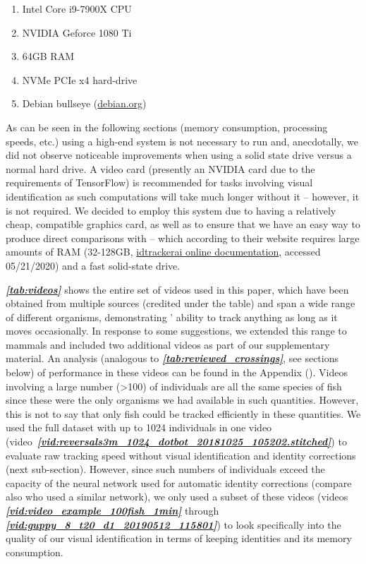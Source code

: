 \documentclass[9pt,lineno]{elife}
\newcommand{\vidref}[1]{\textit{\textbf{\ref{#1}}}}
\newcommand{\tableref}[1]{\textit{\textbf{\ref{tab:#1}}}\xspace}
\newcommand{\videoref}[1]{video~\textit{\textbf{\ref{#1}}}}
\newcommand{\idtracker}{\protect\path{ idtracker.ai}}
\newcommand{\TRex}{\protect\path{TRex}}
\begin{document}
\begin{enumerate} [label=\textnormal{$\bullet$}]
\item \label{ref:hardware_recommend} Intel Core i9-7900X CPU
\item NVIDIA Geforce 1080 Ti
\item 64GB RAM
\item NVMe PCIe x4 hard-drive
\item Debian bullseye (\href{https://www.debian.org/devel/debian-installer/}{debian.org})
\end{enumerate}

As can be seen in the following sections (memory consumption, processing speeds, etc.) using a high-end system is not necessary to run \TRex{} and, anecdotally, we did not observe noticeable improvements when using a solid state drive versus a normal hard drive. A video card (presently an NVIDIA card due to the requirements of TensorFlow) is recommended for tasks involving visual identification as such computations will take much longer without it -- however, it is not required. We decided to employ this system due to having a relatively cheap, compatible graphics card, as well as to ensure that we have an easy way to produce direct comparisons with \idtracker{} -- which according to their website requires large amounts of RAM (32-128GB, \href{https://idtrackerai.readthedocs.io/en/latest/how_to_install.html}{idtrackerai online documentation}, accessed 05/21/2020) and a fast solid-state drive.

\tableref{videos} shows the entire set of videos used in this paper, which have been obtained from multiple sources (credited under the table) and span a wide range of different organisms, demonstrating \TRex{}' ability to track anything as long as it moves occasionally. {\color{blue} In response to some suggestions, we extended this range to mammals and included two additional videos as part of our supplementary material. An analysis (analogous to \tableref{reviewed_crossings}, see sections below) of \TRex{'} performance in these videos can be found in the Appendix ().} Videos involving a large number (>100) of individuals are all the same species of fish since these were the only organisms we had available in such quantities. However, this is not to say that only fish could be tracked efficiently in these quantities. We used the full dataset with up to 1024 individuals in one video (\videoref{vid:reversals3m_1024_dotbot_20181025_105202.stitched}) to evaluate raw tracking speed without visual identification and identity corrections (next sub-section). However, since such numbers of individuals exceed the capacity of the neural network used for automatic identity corrections (compare also \cite{idtrackerai} who used a similar network), we only used a subset of these videos (videos \vidref{vid:video_example_100fish_1min} through \vidref{vid:guppy_8_t20_d1_20190512_115801}) to look specifically into the quality of our visual identification in terms of keeping identities and its memory consumption.
\end{document}

